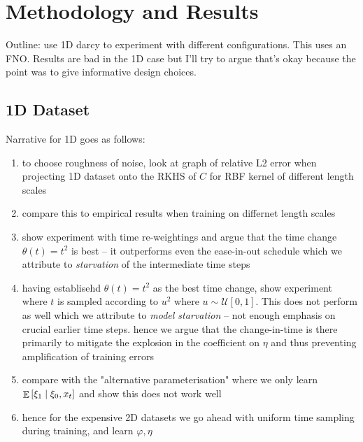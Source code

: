 \chapter{Methodology and Results}\label{cha:4}

\ifpdf
\graphicspath{{Chapter4/Figs/Raster/}{Chapter4/Figs/PDF/}{Chapter4/Figs/}}
\else
\graphicspath{{Chapter4/Figs/Vector/}{Chapter4/Figs/}}
\fi

Outline: use 1D darcy to experiment with different configurations. This uses an FNO. Results are bad in the 1D case but I'll try to argue that's okay because the point was to give informative design choices.

\section{1D Dataset}

Narrative for 1D goes as follows:
\begin{enumerate}
  \item to choose roughness of noise, look at graph of relative L2 error when projecting 1D dataset onto the RKHS of \(C\) for RBF kernel of different length scales
  \item compare this to empirical results when training on differnet length scales
  \item show experiment with time re-weightings and argue that the time change \(\theta(t) = t^{2}\) is best -- it outperforms even the ease-in-out schedule which we attribute to \textit{starvation} of the intermediate time steps
  \item having establisehd \(\theta(t) = t^{2}\) as the best time change, show experiment where \(t\) is sampled according to \(u^{2}\) where \(u \sim \mathcal{U}[0, 1]\). This does not perform as well which we attribute to \textit{model starvation} -- not enough emphasis on crucial earlier time steps. hence we argue that the change-in-time is there primarily to mitigate the explosion in the coefficient on \(\eta\) and thus preventing amplification of training errors
  \item compare with the "alternative parameterisation" where we only learn \(\mathop{\mathbb{E}}\qty[\xi_{1} \mid \xi_{0}, x_{t}]\) and show this does not work well
  \item hence for the expensive 2D datasets we go ahead with uniform time sampling during training, and learn \(\varphi, \eta\)
\end{enumerate}
